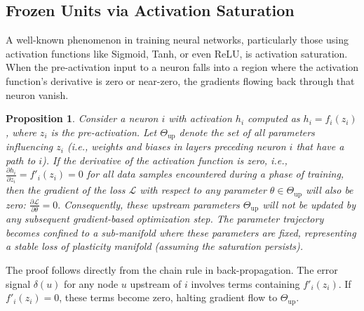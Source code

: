 \documentclass{article}
\newcommand{\Loss}{\mathcal{L}}
\newtheorem{proposition}{Proposition}[section]
\begin{document}
\subsection{Frozen Units via Activation Saturation}

A well-known phenomenon in training neural networks, particularly those using activation functions like Sigmoid, Tanh, or even ReLU, is activation saturation. When the pre-activation input to a neuron falls into a region where the activation function's derivative is zero or near-zero, the gradients flowing back through that neuron vanish.

\begin{proposition}
\label{prop:saturated}
Consider a neuron $i$ with activation $h_i$ computed as $h_i = f_i(z_i)$, where $z_i$ is the pre-activation. Let $\Theta_{\text{up}}$ denote the set of all parameters influencing $z_i$ (i.e., weights and biases in layers preceding neuron $i$ that have a path to $i$). If the derivative of the activation function is zero, i.e.,
\(
\frac{\partial h_i}{\partial z_i} = f'_i(z_i) = 0
\)
for all data samples encountered during a phase of training, then the gradient of the loss $\Loss$ with respect to any parameter $\theta \in \Theta_{\text{up}}$ will also be zero:
\(
\frac{\partial\Loss}{\partial\theta} = 0.
\)
Consequently, these upstream parameters $\Theta_{\text{up}}$ will not be updated by any subsequent gradient-based optimization step. The parameter trajectory becomes confined to a sub-manifold where these parameters are fixed, representing a stable loss of plasticity manifold (assuming the saturation persists).
\end{proposition}

The proof follows directly from the chain rule in back-propagation. The error signal $\delta(u)$ for any node $u$ upstream of $i$ involves terms containing $f'_i(z_i)$. If $f'_i(z_i)=0$, these terms become zero, halting gradient flow to $\Theta_{\text{up}}$.
\end{document}
